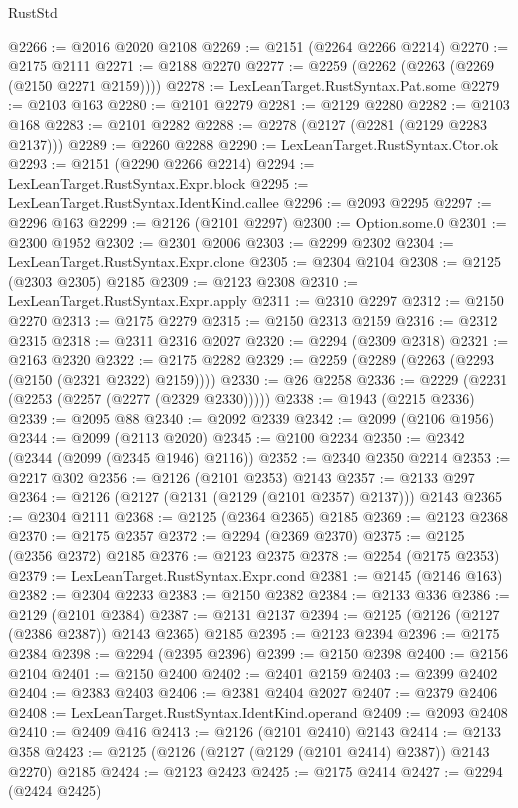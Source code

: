 \begin{lexlean}{RustStd}
\begin{coremodule}
@2266 := @2016 @2020 @2108
@2269 := @2151 (@2264 @2266 @2214)
@2270 := @2175 @2111
@2271 := @2188 @2270
@2277 := @2259 (@2262 (@2263 (@2269 (@2150 @2271 @2159))))
@2278 := LexLeanTarget.RustSyntax.Pat.some
@2279 := @2103 @163
@2280 := @2101 @2279
@2281 := @2129 @2280
@2282 := @2103 @168
@2283 := @2101 @2282
@2288 := @2278 (@2127 (@2281 (@2129 @2283 @2137)))
@2289 := @2260 @2288
@2290 := LexLeanTarget.RustSyntax.Ctor.ok
@2293 := @2151 (@2290 @2266 @2214)
@2294 := LexLeanTarget.RustSyntax.Expr.block
@2295 := LexLeanTarget.RustSyntax.IdentKind.callee
@2296 := @2093 @2295
@2297 := @2296 @163
@2299 := @2126 (@2101 @2297)
@2300 := Option.some.{0}
@2301 := @2300 @1952
@2302 := @2301 @2006
@2303 := @2299 @2302
@2304 := LexLeanTarget.RustSyntax.Expr.clone
@2305 := @2304 @2104
@2308 := @2125 (@2303 @2305) @2185
@2309 := @2123 @2308
@2310 := LexLeanTarget.RustSyntax.Expr.apply
@2311 := @2310 @2297
@2312 := @2150 @2270
@2313 := @2175 @2279
@2315 := @2150 @2313 @2159
@2316 := @2312 @2315
@2318 := @2311 @2316 @2027
@2320 := @2294 (@2309 @2318)
@2321 := @2163 @2320
@2322 := @2175 @2282
@2329 := @2259 (@2289 (@2263 (@2293 (@2150 (@2321 @2322) @2159))))
@2330 := @26 @2258
@2336 := @2229 (@2231 (@2253 (@2257 (@2277 (@2329 @2330)))))
@2338 := @1943 (@2215 @2336)
@2339 := @2095 @88
@2340 := @2092 @2339
@2342 := @2099 (@2106 @1956)
@2344 := @2099 (@2113 @2020)
@2345 := @2100 @2234
@2350 := @2342 (@2344 (@2099 (@2345 @1946) @2116))
@2352 := @2340 @2350 @2214
@2353 := @2217 @302
@2356 := @2126 (@2101 @2353) @2143
@2357 := @2133 @297
@2364 := @2126 (@2127 (@2131 (@2129 (@2101 @2357) @2137))) @2143
@2365 := @2304 @2111
@2368 := @2125 (@2364 @2365) @2185
@2369 := @2123 @2368
@2370 := @2175 @2357
@2372 := @2294 (@2369 @2370)
@2375 := @2125 (@2356 @2372) @2185
@2376 := @2123 @2375
@2378 := @2254 (@2175 @2353)
@2379 := LexLeanTarget.RustSyntax.Expr.cond
@2381 := @2145 (@2146 @163)
@2382 := @2304 @2233
@2383 := @2150 @2382
@2384 := @2133 @336
@2386 := @2129 (@2101 @2384)
@2387 := @2131 @2137
@2394 := @2125 (@2126 (@2127 (@2386 @2387)) @2143 @2365) @2185
@2395 := @2123 @2394
@2396 := @2175 @2384
@2398 := @2294 (@2395 @2396)
@2399 := @2150 @2398
@2400 := @2156 @2104
@2401 := @2150 @2400
@2402 := @2401 @2159
@2403 := @2399 @2402
@2404 := @2383 @2403
@2406 := @2381 @2404 @2027
@2407 := @2379 @2406
@2408 := LexLeanTarget.RustSyntax.IdentKind.operand
@2409 := @2093 @2408
@2410 := @2409 @416
@2413 := @2126 (@2101 @2410) @2143
@2414 := @2133 @358
@2423 := @2125 (@2126 (@2127 (@2129 (@2101 @2414) @2387)) @2143 @2270) @2185
@2424 := @2123 @2423
@2425 := @2175 @2414
@2427 := @2294 (@2424 @2425)

\end{coremodule}
\end{lexlean}
